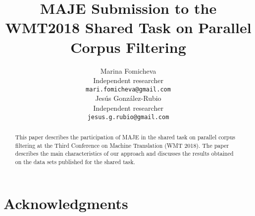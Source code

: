 \documentclass[11pt,a4paper]{article}
\title{MAJE Submission to the\\WMT2018 Shared Task on Parallel Corpus Filtering}
\author{Marina Fomicheva \\
  Independent researcher \\
  {\tt mari.fomicheva@gmail.com} \\\And
  Jes\'us Gonz\'alez-Rubio \\
  Independent researcher\\
  {\tt jesus.g.rubio@gmail.com} \\}
\date{}
\begin{document}
\maketitle
\begin{abstract}
  This paper describes the participation of MAJE in the shared task on parallel corpus filtering at the Third Conference on Machine Translation (WMT 2018). The paper describes the main characteristics of our approach and discusses the results obtained on the data sets published for the shared task.
\end{abstract}








\section*{Acknowledgments}





\end{document}
